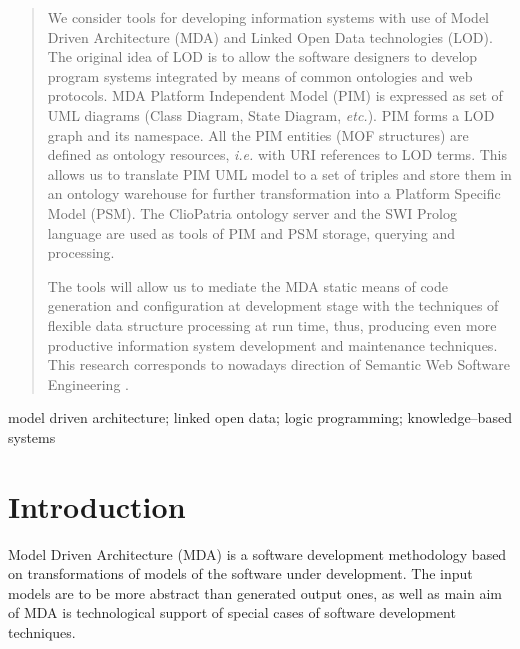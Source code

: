 \documentclass[conference,a4paper]{IEEEtran}
\begin{document}
\begin{abstract}
We consider tools for developing information systems with use of Model Driven Architecture (MDA) and Linked Open Data technologies (LOD).  The original idea of LOD is to allow the software designers to develop program systems integrated by means of common ontologies and web protocols.  MDA Platform Independent Model (PIM) is expressed as set of UML diagrams (Class Diagram, State Diagram, \emph{etc.}).  PIM forms a LOD graph and its namespace.  All the PIM entities (MOF structures) are defined as ontology resources, \emph{i.e.} with URI references to LOD terms.  This allows us to translate PIM UML model to a set of triples and store them in an ontology warehouse for further transformation into a Platform Specific Model (PSM).  The ClioPatria ontology server and the SWI Prolog language are used as tools of PIM and PSM storage, querying and processing.

The tools will allow us to mediate the MDA static means of code generation and configuration at development stage with the techniques of flexible data structure processing at run time, thus, producing even more productive information system development and maintenance techniques.  This research corresponds to nowadays direction of Semantic Web Software Engineering \cite{SWEB}.

\end{abstract}
\vspace{1em}
\begin{IEEEkeywords} model driven architecture; linked open data; logic programming; knowledge--based systems
\end{IEEEkeywords}





%
\IEEEpeerreviewmaketitle



\section{Introduction}

Model Driven Architecture (MDA) is a software development methodology based on transformations of models of the software under development.  The input models are to be more abstract than generated output ones, as well as main aim of MDA is technological support of special cases of software development techniques.
\end{document}
